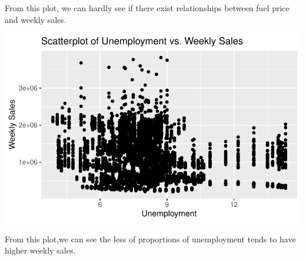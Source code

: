 \documentclass[
  letterpaper,
  DIV=11,
  numbers=noendperiod]{scrartcl}
\begin{document}
From this plot, we can hardly see if there exist relationships between
fuel price and weekly sales.

\includegraphics{678final_files/figure-pdf/unnamed-chunk-21-1.pdf}

From this plot,we can see the less of proportions of unemployment tends
to have higher weekly sales.
\end{document}
